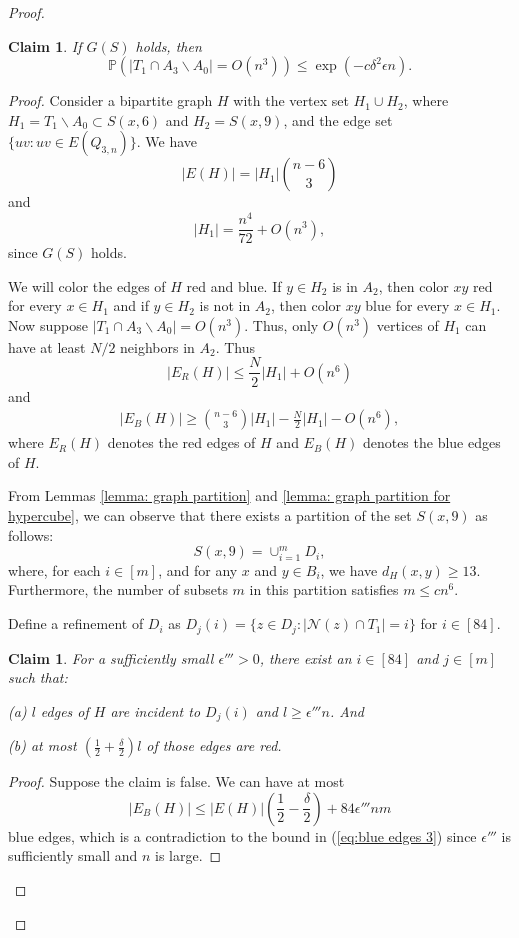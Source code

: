 \documentclass[reqno,11pt]{amsart}
\newtheorem{claim}[theorem]{Claim}
\renewcommand{\leq}{\leqslant}
\renewcommand{\geq}{\geqslant}
\begin{document}
\begin{proof}
\begin{claim} If $G(S)$ holds, then 
$$\mathbb{P}(|T_1 \cap A_3 \backslash A_0|=O(n^3)) \leq \exp(-c\delta^2\epsilon n).$$
\end{claim}
\begin{proof} 
Consider a bipartite graph $H$ with the vertex set $H_1 \cup H_2$, where $H_1=T_1 \backslash A_0 \subset S(x,6)$ and $H_2=S(x,9)$, and the edge set $\{uv: uv \in E(Q_{3,n}) \}$. We have 
$$|E(H)|=|H_1|\binom{n-6}{3}$$ and 
$$|H_1|=\frac{n^4}{72}+O(n^3),$$ since $G(S)$ holds.

We will color the edges of $H$ red and blue. If $y \in H_2$ is in $A_2$, then color $xy$ red for every $x \in H_1$ and if $y \in H_2$ is not in $A_2$, then color $xy$ blue for every $x \in H_1$. Now suppose $|T_1 \cap A_3 \backslash A_0|=O(n^3)$. Thus, only $O(n^3)$ vertices of $H_1$ can have at least $N/2$ neighbors in $A_2$. Thus 
$$|E_R(H)| \leq \frac{N}{2}|H_1|+O(n^6)$$
and 
\begin{align} \label{eq:blue edges 3}
    |E_B(H)| \geq \binom{n-6}{3}|H_1|-\frac{N}{2}|H_1|-O(n^6),
\end{align}
where $E_R(H)$ denotes the red edges of $H$ and $E_B(H)$ denotes the blue edges of $H$.

From Lemmas \ref{lemma: graph partition} and \ref{lemma: graph partition for hypercube}, we can observe that there exists a partition of the set $S(x,9)$ as follows:
$$S(x,9)= \cup_{i=1}^m D_i,$$
where, for each $i \in [m]$, and for any $x$ and $y \in B_i$, we have $d_H(x,y) \geq 13$. Furthermore, the number of subsets $m$ in this partition satisfies $m \leq cn^6$.

Define a refinement of $D_i$ as $D_j(i)=\{z \in D_j: |\mathcal{N}(z) \cap T_1|=i\}$ for $i \in [84].$

\begin{claim} For a sufficiently small $\epsilon''' >0$, there exist an $i \in[84]$ and $j \in [m]$ such that:

(a) $l$ edges of $H$ are incident to $D_j(i)$ and $l \geq \epsilon''' n$. And

(b) at most $(\frac{1}{2}+\frac{\delta}{2})l$ of those edges are red.
\end{claim}
\begin{proof}
Suppose the claim is false. We can have at most 
$$|E_B(H)| \leq |E(H)|(\frac{1}{2}-\frac{\delta}{2})+84\epsilon''' nm$$ blue edges, which is a contradiction to the bound in (\ref{eq:blue edges 3}) since $\epsilon'''$ is sufficiently small and $n$ is large.
\end{proof}



\end{proof}
\end{proof}
\end{document}
